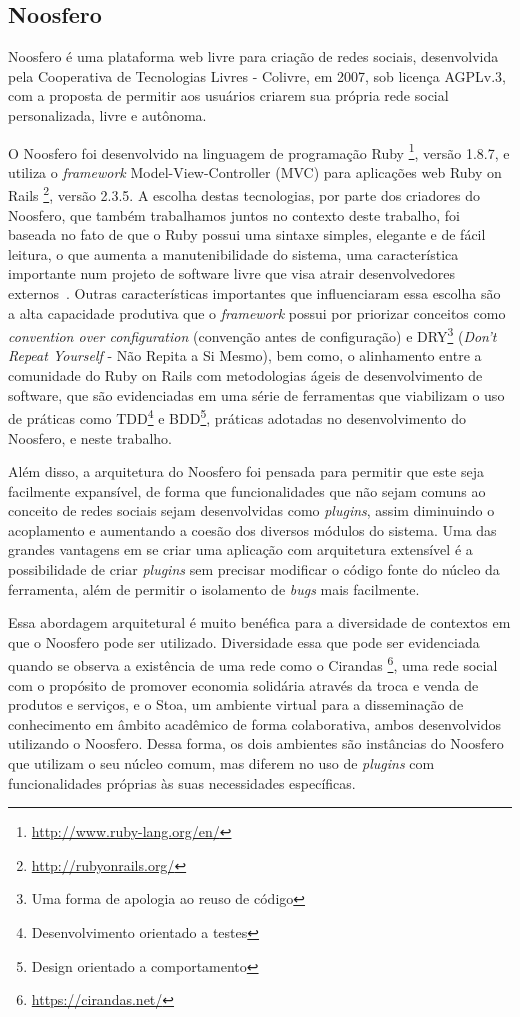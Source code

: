 \subsection{Noosfero}

Noosfero é uma plataforma web livre para criação de redes sociais,
desenvolvida pela Cooperativa de Tecnologias Livres - Colivre, em 2007, sob
licença AGPLv.3, com a proposta de permitir aos usuários criarem sua própria
rede social personalizada, livre e autônoma.

O Noosfero foi desenvolvido na linguagem de programação Ruby%
\footnote{\url{http://www.ruby-lang.org/en/}},
versão 1.8.7, e utiliza o \textit{framework} Model-View-Controller (MVC) para
aplicações web Ruby on Rails%
\footnote{\url{http://rubyonrails.org/}}, versão 2.3.5.
%
A escolha destas tecnologias, por parte dos criadores do Noosfero, que também
trabalhamos juntos no contexto deste trabalho,
foi baseada no fato de que o Ruby possui uma sintaxe
simples, elegante e de fácil leitura, o que aumenta a manutenibilidade do sistema,
uma característica importante num projeto de software livre que visa atrair
desenvolvedores externos~\cite{meirelles2013}.
%
Outras características importantes que influenciaram essa escolha são a alta
capacidade produtiva que o \textit{framework} possui por priorizar conceitos como
\textit{convention over configuration} (convenção antes de configuração)
e DRY\footnote{Uma forma de apologia ao reuso de código}
(\textit{Don't Repeat Yourself} - Não Repita a Si Mesmo), bem como, o alinhamento
entre a comunidade do Ruby on Rails com metodologias ágeis de
desenvolvimento de software, que são evidenciadas em uma série de ferramentas que
viabilizam o uso de práticas como TDD\footnote{Desenvolvimento orientado a testes}
e BDD\footnote{Design orientado a comportamento}, práticas adotadas no
desenvolvimento do Noosfero, e neste trabalho.

Além disso, a arquitetura do Noosfero foi pensada para permitir que este seja facilmente
expansível, de forma que funcionalidades que não sejam comuns ao conceito de
redes sociais sejam desenvolvidas como \textit{plugins}, assim diminuindo
o acoplamento e aumentando a coesão dos diversos módulos do sistema.
%
Uma das grandes vantagens em se criar uma aplicação com arquitetura extensível
é a possibilidade de criar \textit{plugins} sem precisar modificar o código
fonte do núcleo da ferramenta, além de permitir o isolamento de \textit{bugs}
mais facilmente.

Essa abordagem arquitetural é muito benéfica para a diversidade de contextos
em que o Noosfero pode ser utilizado. Diversidade essa que pode ser evidenciada
quando se observa a existência de uma rede como o Cirandas%
\footnote{\url{https://cirandas.net/}},
uma rede social com o propósito de promover economia solidária através
da troca e venda de produtos e serviços, e o
Stoa, um ambiente virtual para a disseminação de conhecimento em âmbito
acadêmico de forma colaborativa, ambos desenvolvidos utilizando o Noosfero.
%
Dessa forma, os dois ambientes são instâncias do Noosfero que utilizam o seu
núcleo comum, mas diferem no uso de \textit{plugins} com funcionalidades
próprias às suas necessidades específicas.

